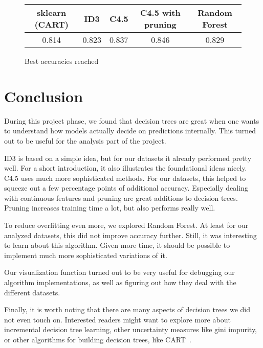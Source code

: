 \documentclass[a4paper]{article}
\begin{document}
\begin{figure}[h]
	\centering
    \begin{tabular}{c|c|c|c|c}
    \textbf{sklearn (CART)} & \textbf{ID3} & \textbf{C4.5} & \textbf{C4.5 with pruning} & \textbf{Random Forest} \\
        \hline
        0.814 & 0.823 & 0.837 & 0.846 & 0.829
    \end{tabular}
    \caption{Best accuracies reached}
    \label{fig:withoutnc}
\end{figure}

\section{Conclusion}

During this project phase, we found that decision trees are great when one wants to understand how models actually decide on predictions internally. This turned out to be useful for the analysis part of the project.

ID3 is based on a simple idea, but for our datasets it already performed pretty well. For a short introduction, it also illustrates the foundational ideas nicely.
C4.5 uses much more sophisticated methods. For our datasets, this helped to squeeze out a few percentage points of additional accuracy. Especially dealing with continuous features and pruning are great additions to decision trees. Pruning increases training time a lot, but also performs really well.

To reduce overfitting even more, we explored Random Forest. At least for our analyzed datasets, this did not improve accuracy further. Still, it was interesting to learn about this algorithm. Given more time, it should be possible to implement much more sophisticated variations of it.

Our visualization function turned out to be very useful for debugging our algorithm implementations, as well as figuring out how they deal with the different datasets.

Finally, it is worth noting that there are many aspects of decision trees we did not even touch on. Interested readers might want to explore more about incremental decision tree learning, other uncertainty measures like gini impurity, or other algorithms for building decision trees, like CART~\cite{friedman2001elements}.



\end{document}
